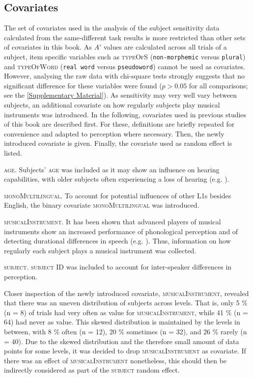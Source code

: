 \subsection{Covariates}\label{section06_2_1}

The set of covariates used in the analysis of the subject sensitivity data calculated from the same-different task results is more restricted than other sets of covariates in this book. As $A'$ values are calculated across all trials of a subject, item specific variables such as \textsc{typeOfS} (\texttt{non-morphemic} versus \texttt{plural}) and \textsc{typeOfWord} (\texttt{real word} versus \texttt{pseudoword}) cannot be used as covariates. However, analysing the raw data with chi-square tests strongly suggests that no significant difference for these variables were found ($p>0.05$ for all comparisons; see the \ref{Supplementary Material}). As sensitivity may very well vary between subjects, an additional covariate on how regularly subjects play musical instruments was introduced. In the following, covariates used in previous studies of this book are described first. For these, definitions are briefly repeated for convenience and adapted to perception where necessary. Then, the newly introduced covariate is given. Finally, the covariate used as random effect is listed.

\textsc{age}. Subjects’ \textsc{age} was included as it may show an influence on hearing capabilities, with older subjects often experiencing a loss of hearing (e.g. \cite{Lee2013}).

\textsc{monoMultilingual}. To account for potential influences of other L1s besides English, the binary covariate \textsc{monoMultilingual} was introduced. 

\textsc{musicalInstrument}. It has been shown that advanced players of musical instruments show an increased performance of phonological perception and of detecting durational differences in speech (e.g. \cite{Anvari2002,Milovanov2009}). Thus, information on how regularly each subject plays a musical instrument was collected.

\textsc{subject}. \textsc{subject} ID was included to account for inter-speaker differences in perception.

Closer inspection of the newly introduced covariate, \textsc{musicalInstrument}, revealed that there was an uneven distribution of subjects across levels. That is, only 5 \% (n = 8) of trials had very often as value for \textsc{musicalInstrument}, while 41 \% (n = 64) had never as value. This skewed distribution is maintained by the levels in between, with 8 \% often (n = 12), 20 \% sometimes (n = 32), and 26 \% rarely (n = 40). Due to the skewed distribution and the therefore small amount of data points for some levels, it was decided to drop \textsc{musicalInstrument} as covariate. If there was an effect of \textsc{musicalInstrument} nonetheless, this should then be indirectly considered as part of the \textsc{subject} random effect.

